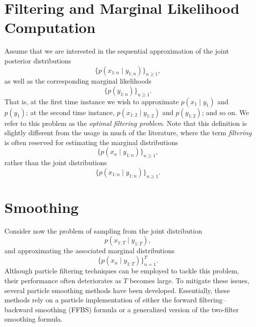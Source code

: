 \section{Filtering and Marginal Likelihood Computation}

Assume that we are interested in the sequential approximation of the joint posterior distributions
\[
	\{p(x_{1:n} \mid y_{1:n})\}_{n \ge 1},
\]
as well as the corresponding marginal likelihoods
\[
	\{p(y_{1:n})\}_{n \ge 1}.
\]
That is, at the first time instance we wish to approximate \(p(x_1 \mid y_1)\) and \(p(y_1)\); at the second time instance, \(p(x_{1:2} \mid y_{1:2})\) and \(p(y_{1:2})\); and so on. We refer to this problem as the \emph{optimal filtering problem}. Note that this definition is slightly different from the usage in much of the literature, where the term \emph{filtering} is often reserved for estimating the marginal distributions
\[
	\{p(x_n \mid y_{1:n})\}_{n \ge 1},
\]
rather than the joint distributions
\[
	\{p(x_{1:n} \mid y_{1:n})\}_{n \ge 1}.
\]

\section{Smoothing}

Consider now the problem of sampling from the joint distribution
\[
	p(x_{1:T} \mid y_{1:T}),
\]
and approximating the associated marginal distributions
\[
	\{p(x_n \mid y_{1:T})\}_{n=1}^{T}.
\]
Although particle filtering techniques can be employed to tackle this problem, their performance often deteriorates as \(T\) becomes large. To mitigate these issues, several particle smoothing methods have been developed. Essentially, these methods rely on a particle implementation of either the forward filtering--backward smoothing (FFBS) formula or a generalized version of the two-filter smoothing formula.
